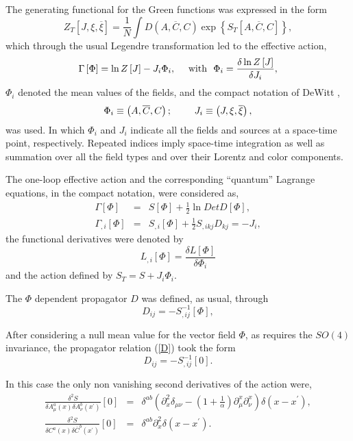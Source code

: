 \documentclass[12pt,letterpaper]{report}
\begin{document}
The generating functional for the Green functions was expressed in
the form
\[
Z_T\left[ J,\xi,\overline{\xi }\right] =\frac 1N\int D\left(
A,\overline{C},C\right) \exp \left\{ S_T\left[
A,\overline{C},C\right] \right\},
\]
which through the usual Legendre transformation led to the
effective action,
\begin{equation}
\Gamma \left[ \Phi \right] =\ln Z\left[ J\right] -J_i\Phi
_i,\text{ \quad with ~}\Phi _i=\frac{\delta \ln Z\left[ J\right]
}{\delta J_i}, \label{efec}
\end{equation}
$\Phi _i$ denoted the mean values of the fields, and the compact
notation of DeWitt \cite{Daemi},
\[
\Phi _i\equiv \left(A,\overline{C},C\right) ;\text{ \qquad
}J_i\equiv \left(J,\xi,\overline{\xi }\right),
\]
was used. In which $\Phi _i$ and $J_i$ indicate all the fields and
sources at a space-time point, respectively. Repeated indices
imply space-time integration as well as summation over all the
field types and over their Lorentz and color components.

The one-loop effective action and the corresponding ``quantum''
Lagrange equations, in the compact notation, were considered as,
\begin{eqnarray}
\Gamma \left[ \Phi \right] &=&S\left[ \Phi \right] +\frac 12\ln
DetD\left[ \Phi \right], \label{acc} \\ \Gamma _{,i}\left[ \Phi
\right] &=&S_{,i}\left[ \Phi \right] +\frac 12S_{,ikj}D_{kj}=-J_i,
\label{ecmo}
\end{eqnarray}
the functional derivatives were denoted by
\[
L_{,i}\left[ \Phi \right] =\frac{\delta L\left[ \Phi \right]
}{\delta \Phi _i }
\]
and the action defined by $S_T=S+J_i\Phi _i$.

The $\Phi$ dependent propagator $D$ was defined, as usual, through
\begin{equation}
D_{ij}=-S_{,ij}^{-1}\left[ \Phi \right], \label{D}
\end{equation}

After considering a null mean value for the vector field $\Phi$,
as requires the $SO(4)$ invariance, the propagator relation
(\ref{D}) took the form
\begin{equation}
D_{ij}=-S_{,ij}^{-1}\left[ 0\right].
\end{equation}

In this case the only non vanishing second derivatives of the
action were,
\begin{eqnarray}
\frac{\delta ^2S}{\delta A_\mu ^a\left(x\right) \delta A_\nu
^b\left(x^{\prime }\right) }\left[ 0\right] &=&\delta ^{ab}\left(
\partial _{x}^2\delta _{\mu \nu }-\left(1+\frac
1\alpha \right) \partial _\mu ^{x}\partial _\nu ^{x}\right) \delta
\left(x-x^{\prime }\right), \label{Sglu} \\ \frac{\delta
^2S}{\delta C^a\left(x\right) \delta \overline{C}^b\left(
x^{\prime }\right) }\left[ 0\right] &=&\delta ^{ab}\partial
_x^2\delta \left(x-x^{\prime }\right). \label{Sgho}
\end{eqnarray}
\end{document}
